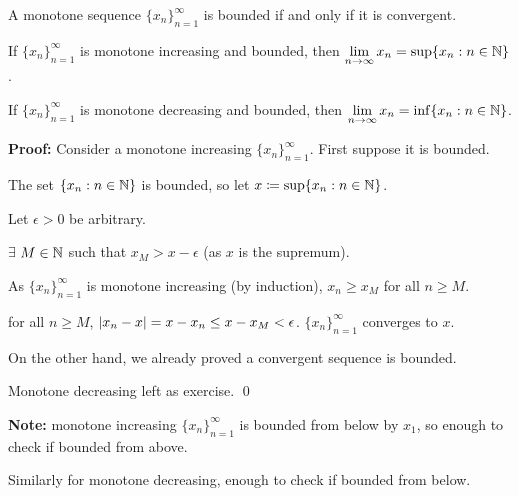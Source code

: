 \documentclass[10pt,aspectratio=169]{beamer}
\begin{document}
\begin{frame}

\begin{theorem}
A monotone sequence $\{ x_n \}_{n=1}^\infty$ is bounded if and only if it is convergent.

\pause
If $\{ x_n \}_{n=1}^\infty$ is monotone increasing and bounded, then \quad
$\displaystyle
\lim_{n\to \infty} x_n = \sup \{ x_n : n \in {\mathbb{N}} \}$.

\pause
If $\{ x_n \}_{n=1}^\infty$ is monotone decreasing and bounded, then \quad
$\displaystyle
\lim_{n\to \infty} x_n = \inf \{ x_n : n \in {\mathbb{N}} \}$.
\end{theorem}

\pause

\textbf{Proof:}
Consider a monotone increasing $\{x_n\}_{n=1}^\infty$.  First suppose it is bounded.

\pause
The set $\{ x_n : n \in  {\mathbb{N}} \}$ is bounded, so let
\quad $x \coloneqq \sup \{ x_n : n \in {\mathbb{N}} \}$.

\pause
Let $\epsilon > 0$ be arbitrary.

\pause
$\exists$ $M \in {\mathbb{N}}$ such that $x_{M} > x-\epsilon$ \quad (as $x$ is the supremum).

\pause
As $\{ x_n \}_{n=1}^\infty$ is monotone increasing (by induction),
\quad $x_n \geq x_M$ for all $n \geq M$.

\pause
\thus \quad for all $n \geq M$,
\quad $\left\lvert {x_n-x} \right\rvert = x-x_n \leq x-x_{M} < \epsilon$.
\pause
\wthus $\{x_n \}_{n=1}^\infty$ converges to $x$.

\medskip
\pause

On the other hand, we already proved a convergent sequence is bounded.

\medskip
\pause

Monotone decreasing left as exercise.
\qed

\pause
\medskip

\textbf{Note:} monotone increasing $\{ x_n \}_{n=1}^\infty$ is bounded from below
by $x_1$, so enough to check if bounded from above.

\medskip
\pause

Similarly for monotone decreasing, enough to check if bounded from below.
\end{frame}
\end{document}
